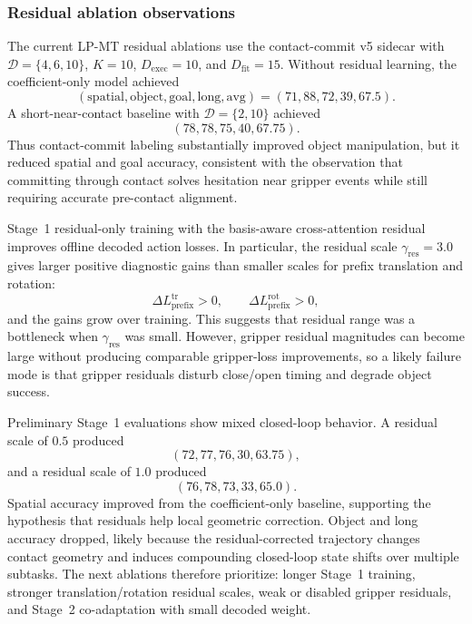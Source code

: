 \documentclass[10pt,twocolumn,letterpaper]{article}
\begin{document}
\subsubsection*{Residual ablation observations}
The current LP-MT residual ablations use the contact-commit v5 sidecar with $\mathcal{D}=\{4,6,10\}$, $K=10$, $D_{\mathrm{exec}}=10$, and $D_{\mathrm{fit}}=15$. Without residual learning, the coefficient-only model achieved
\begin{equation}
(\mathrm{spatial},\mathrm{object},\mathrm{goal},\mathrm{long},\mathrm{avg})
=(71,88,72,39,67.5).
\end{equation}
A short-near-contact baseline with $\mathcal{D}=\{2,10\}$ achieved
\begin{equation}
(78,78,75,40,67.75).
\end{equation}
Thus contact-commit labeling substantially improved object manipulation, but it reduced spatial and goal accuracy, consistent with the observation that committing through contact solves hesitation near gripper events while still requiring accurate pre-contact alignment.

Stage~1 residual-only training with the basis-aware cross-attention residual improves offline decoded action losses. In particular, the residual scale $\gamma_{\mathrm{res}}=3.0$ gives larger positive diagnostic gains than smaller scales for prefix translation and rotation:
\begin{equation}
\Delta L^{\mathrm{tr}}_{\mathrm{prefix}}>0,
\qquad
\Delta L^{\mathrm{rot}}_{\mathrm{prefix}}>0,
\end{equation}
and the gains grow over training. This suggests that residual range was a bottleneck when $\gamma_{\mathrm{res}}$ was small. However, gripper residual magnitudes can become large without producing comparable gripper-loss improvements, so a likely failure mode is that gripper residuals disturb close/open timing and degrade object success.

Preliminary Stage~1 evaluations show mixed closed-loop behavior. A residual scale of $0.5$ produced
\begin{equation}
(72,77,76,30,63.75),
\end{equation}
and a residual scale of $1.0$ produced
\begin{equation}
(76,78,73,33,65.0).
\end{equation}
Spatial accuracy improved from the coefficient-only baseline, supporting the hypothesis that residuals help local geometric correction. Object and long accuracy dropped, likely because the residual-corrected trajectory changes contact geometry and induces compounding closed-loop state shifts over multiple subtasks. The next ablations therefore prioritize: longer Stage~1 training, stronger translation/rotation residual scales, weak or disabled gripper residuals, and Stage~2 co-adaptation with small decoded weight.
\end{document}
